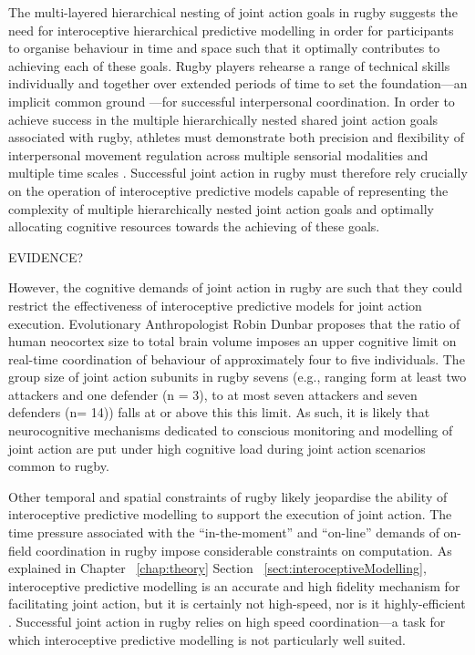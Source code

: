 \begin{CJK}{UTF8}{gbsn}
  The multi-layered hierarchical nesting of joint action goals in rugby suggests the need for interoceptive hierarchical predictive modelling in order for participants to organise behaviour in time and space such that it optimally contributes to achieving each of these goals. Rugby players rehearse a range of technical skills individually and together over extended periods of time to set the foundation---an implicit common ground \citep[see][]{Noy2017}---for successful interpersonal coordination.  In order to achieve success in the multiple hierarchically nested shared joint action goals associated with rugby, athletes must demonstrate both precision and flexibility of interpersonal movement regulation across multiple sensorial modalities and multiple time scales \citep{Keller2014}. Successful joint action in rugby must therefore rely crucially on the operation of interoceptive predictive models capable of representing the complexity of multiple hierarchically nested joint action goals and optimally allocating cognitive resources towards the achieving of these goals.

  EVIDENCE?

  However, the cognitive demands of joint action in rugby are such that they could restrict the effectiveness of interoceptive predictive models for joint action execution.  Evolutionary Anthropologist Robin Dunbar \textcite{Dunbar1992} proposes that the ratio of human neocortex size to total brain volume imposes an upper cognitive limit on real-time coordination of behaviour of approximately four to five individuals.  The group size of joint action subunits in rugby sevens (e.g., ranging form at least two attackers and one defender (n = 3), to at most seven attackers and seven defenders (n= 14)) falls at or above this this limit.  As such, it is likely that neurocognitive mechanisms dedicated to conscious monitoring and modelling of joint action are put under high cognitive load during joint action scenarios common to rugby.

  Other temporal and spatial constraints of rugby likely jeopardise the ability of interoceptive predictive modelling to support the execution of joint action.  The time pressure associated with the ``in-the-moment'' and ``on-line'' demands of on-field coordination in rugby impose considerable constraints on computation.  As explained in Chapter ~\ref{chap:theory} Section ~\ref{sect:interoceptiveModelling}, interoceptive predictive modelling is an accurate and high fidelity mechanism for facilitating joint action, but it is certainly not high-speed, nor is it highly-efficient \citep{Kahneman2011}. Successful joint action in rugby relies on high speed coordination---a task for which interoceptive predictive modelling is not particularly well suited.


\end{CJK}
